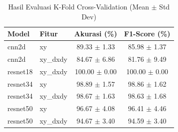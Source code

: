 \begin{table}[H]
  \centering
  \caption{Hasil Evaluasi K-Fold Cross-Validation (Mean $\pm$ Std Dev)}
  \label{tab:kfold-results}
  \begin{tabular}{|l|l|c|c|}
  \hline
  \textbf{Model} & \textbf{Fitur} & \textbf{Akurasi (\%)} & \textbf{F1-Score (\%)} \\ \hline
cnn2d & xy & 89.33 $\pm$ 1.33 & 85.98 $\pm$ 1.37 \\ \hline
cnn2d & xy_dxdy & 84.67 $\pm$ 6.86 & 81.76 $\pm$ 9.49 \\ \hline
resnet18 & xy_dxdy & 100.00 $\pm$ 0.00 & 100.00 $\pm$ 0.00 \\ \hline
resnet34 & xy & 98.89 $\pm$ 1.57 & 98.86 $\pm$ 1.62 \\ \hline
resnet34 & xy_dxdy & 98.67 $\pm$ 1.63 & 98.63 $\pm$ 1.68 \\ \hline
resnet50 & xy & 96.67 $\pm$ 4.08 & 96.41 $\pm$ 4.46 \\ \hline
resnet50 & xy_dxdy & 94.67 $\pm$ 3.40 & 94.59 $\pm$ 3.40 \\ \hline
  \end{tabular}
\end{table}